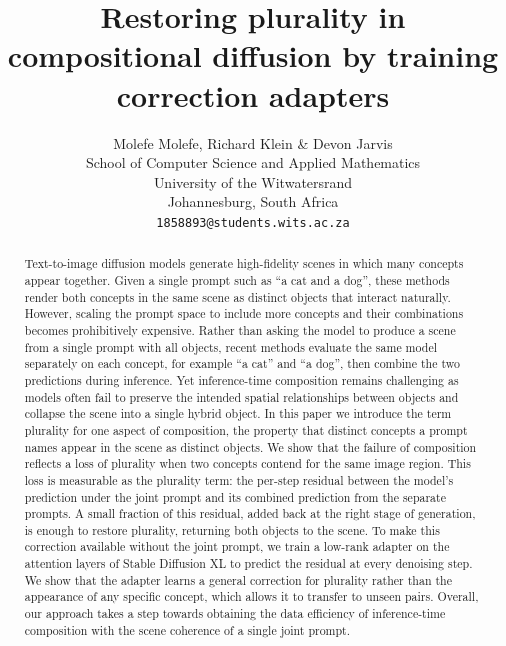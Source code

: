 \documentclass{article} %
\title{Restoring plurality in compositional diffusion by training correction adapters}
\author{Molefe Molefe, Richard Klein \& Devon Jarvis \\
School of Computer Science and Applied Mathematics \\
University of the Witwatersrand \\
Johannesburg, South Africa \\
\texttt{1858893@students.wits.ac.za}}
\begin{document}
\raggedbottom

\maketitle

\begin{abstract}
Text-to-image diffusion models generate high-fidelity scenes in which many concepts appear together. Given a single prompt such as ``a cat and a dog'', these methods render both concepts in the same scene as distinct objects that interact naturally. However, scaling the prompt space to include more concepts and their combinations becomes prohibitively expensive. Rather than asking the model to produce a scene from a single prompt with all objects, recent methods evaluate the same model separately on each concept, for example ``a cat'' and ``a dog'', then combine the two predictions during inference. Yet inference-time composition remains challenging as models often fail to preserve the intended spatial relationships between objects and collapse the scene into a single hybrid object. In this paper we introduce the term plurality for one aspect of composition, the property that distinct concepts a prompt names appear in the scene as distinct objects. We show that the failure of composition reflects a loss of plurality when two concepts contend for the same image region. This loss is measurable as the plurality term: the per-step residual between the model's prediction under the joint prompt and its combined prediction from the separate prompts. A small fraction of this residual, added back at the right stage of generation, is enough to restore plurality, returning both objects to the scene. To make this correction available without the joint prompt, we train a low-rank adapter on the attention layers of Stable Diffusion XL to predict the residual at every denoising step. We show that the adapter learns a general correction for plurality rather than the appearance of any specific concept, which allows it to transfer to unseen pairs. Overall, our approach takes a step towards obtaining the data efficiency of inference-time composition with the scene coherence of a single joint prompt.
\end{abstract}
\end{document}
